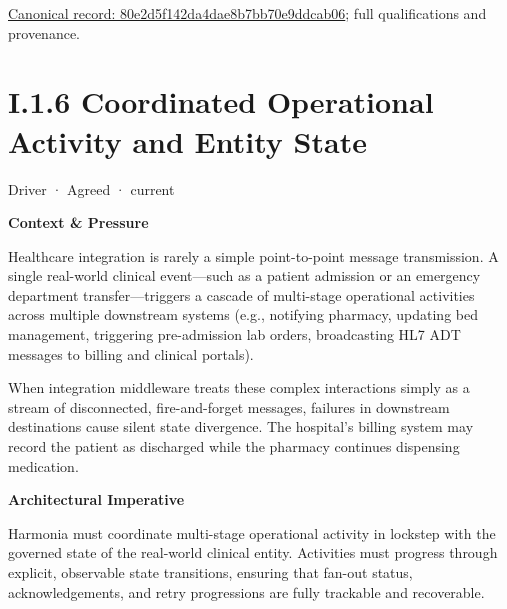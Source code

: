 {\footnotesize \href{../../../../continuum/motivation/driver/80e2d5f142da4dae8b7bb70e9ddcab06.md}{Canonical record: 80e2d5f142da4dae8b7bb70e9ddcab06}; full qualifications and provenance.}\par
\section*{I.1.6 Coordinated Operational Activity and Entity State}
\label{navigation:I.1.6}

\label{element:b3fb294d95024e4382b2c251c389fa66}
{\small Driver · Agreed · current}\par

\par\medskip\textbf{Context \& Pressure}\par


Healthcare integration is rarely a simple point-to-point message transmission. A single real-world clinical event—such as a patient admission or an emergency department transfer—triggers a cascade of multi-stage operational activities across multiple downstream systems (e.g., notifying pharmacy, updating bed management, triggering pre-admission lab orders, broadcasting HL7 ADT messages to billing and clinical portals).



When integration middleware treats these complex interactions simply as a stream of disconnected, fire-and-forget messages, failures in downstream destinations cause silent state divergence. The hospital's billing system may record the patient as discharged while the pharmacy continues dispensing medication.



\par\medskip\textbf{Architectural Imperative}\par


Harmonia must coordinate multi-stage operational activity in lockstep with the governed state of the real-world clinical entity. Activities must progress through explicit, observable state transitions, ensuring that fan-out status, acknowledgements, and retry progressions are fully trackable and recoverable.



